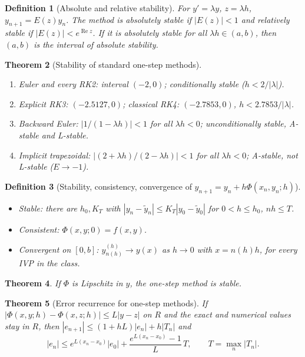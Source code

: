 \documentclass[10pt,a4paper]{article}
\theoremstyle{tight}
\newtheorem{theorem}{Theorem}[section]
\newtheorem{definition}[theorem]{Definition}
\begin{document}
\begin{definition}[Absolute and relative stability]
For \(y'=\lambda y\), \(z=\lambda h\), \(y_{n+1}=E(z)y_n\). The method is absolutely stable if
\(|E(z)|<1\) and relatively stable if \(|E(z)|<e^{\operatorname{Re}z}\). If it is absolutely
stable for all \(\lambda h\in(a,b)\), then \((a,b)\) is the interval of absolute stability.
\end{definition}

\begin{theorem}[Stability of standard one-step methods]
\leavevmode
\begin{enumerate}
  \item Euler and every RK2: interval \((-2,0)\); conditionally stable (\(h<2/|\lambda|\)).
  \item Explicit RK3: \((-2.5127,0)\); classical RK4: \((-2.7853,0)\), \(h<2.7853/|\lambda|\).
  \item Backward Euler: \(|1/(1-\lambda h)|<1\) for all \(\lambda h<0\); unconditionally stable, A-stable and L-stable.
  \item Implicit trapezoidal: \(|(2+\lambda h)/(2-\lambda h)|<1\) for all \(\lambda h<0\); A-stable, not L-stable (\(E\to-1\)).
\end{enumerate}
\end{theorem}

\begin{definition}[Stability, consistency, convergence of \(y_{n+1}=y_n+h\Phi(x_n,y_n;h)\)]
\leavevmode
\begin{itemize}
  \item Stable: there are \(h_0,K_T\) with \(|y_n-\tilde y_n|\le K_T|y_0-\tilde y_0|\) for \(0<h\le h_0\), \(nh\le T\).
  \item Consistent: \(\Phi(x,y;0)=f(x,y)\).
  \item Convergent on \([0,b]\): \(y_{n(h)}^{(h)}\to y(x)\) as \(h\to0\) with \(x=n(h)h\), for every IVP in the class.
\end{itemize}
\end{definition}

\begin{theorem}
If \(\Phi\) is Lipschitz in \(y\), the one-step method is stable.
\end{theorem}

\begin{theorem}[Error recurrence for one-step methods]
If \(|\Phi(x,y;h)-\Phi(x,z;h)|\le L|y-z|\) on \(R\) and the exact and numerical values stay in \(R\), then
\(|e_{n+1}|\le(1+hL)|e_n|+h|T_n|\) and
\[
  |e_n|\le e^{L(x_n-x_0)}|e_0|+\frac{e^{L(x_n-x_0)}-1}{L}\,T,\qquad T=\max_n|T_n|.
\]
\end{theorem}
\end{document}
